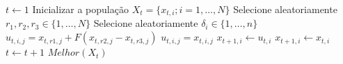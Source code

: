 \documentclass[]{article}
\begin{document}
\begin{algorithm}
	\caption{Evolução Diferencial}\label{euclid}
	\begin{algorithmic}[1]
		\State $t \gets 1$
		\State Inicializar a população $X_t = \{x_{t,i}; i = 1, \dots, N\}$	
				\State Selecione aleatoriamente $r_1, r_2, r_3 \in \{1, \dots, N\}$
				\State Selecione aleatoriamente $\delta_i \in \{1, \dots, n\}$
						\State $u_{t,i,j} = x_{t,r1,j} + F (x_{t,r2,j} - x_{t,r3,j})$
					\Else 
						\State $u_{t,i,j} = x_{t,i,j}$
					\EndIf
				\EndFor
			\EndFor
					\State $x_{t+1,i} \gets u_{t,i}$
				\Else 
					\State $x_{t+1,i} \gets x_{t,i}$
				\EndIf
			\EndFor
			\State $t \gets t + 1$
		\EndWhile
		\Return $Melhor(X_t)$
	\end{algorithmic}
\end{algorithm}
\end{document}
